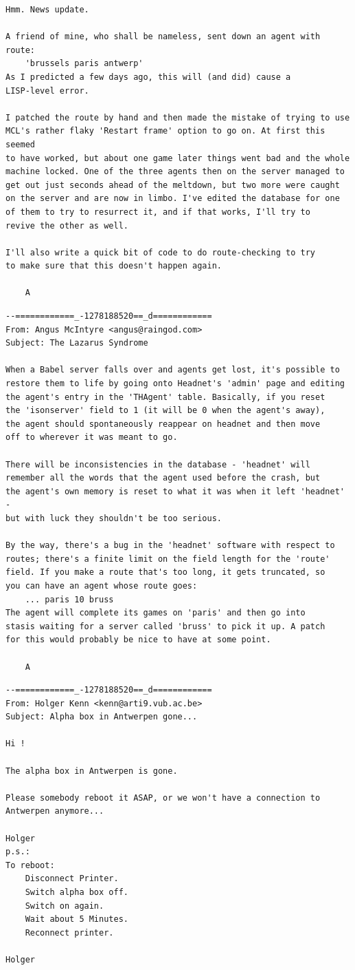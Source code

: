 {\begin{verbatim}
Hmm. News update.

A friend of mine, who shall be nameless, sent down an agent with route:
	'brussels paris antwerp'
As I predicted a few days ago, this will (and did) cause a 
LISP-level error.

I patched the route by hand and then made the mistake of trying to use 
MCL's rather flaky 'Restart frame' option to go on. At first this seemed 
to have worked, but about one game later things went bad and the whole 
machine locked. One of the three agents then on the server managed to 
get out just seconds ahead of the meltdown, but two more were caught 
on the server and are now in limbo. I've edited the database for one 
of them to try to resurrect it, and if that works, I'll try to 
revive the other as well.

I'll also write a quick bit of code to do route-checking to try 
to make sure that this doesn't happen again.

	A
\end{verbatim}
\begin{verbatim}
--============_-1278188520==_d============
From: Angus McIntyre <angus@raingod.com>
Subject: The Lazarus Syndrome

When a Babel server falls over and agents get lost, it's possible to 
restore them to life by going onto Headnet's 'admin' page and editing 
the agent's entry in the 'THAgent' table. Basically, if you reset 
the 'isonserver' field to 1 (it will be 0 when the agent's away), 
the agent should spontaneously reappear on headnet and then move 
off to wherever it was meant to go.

There will be inconsistencies in the database - 'headnet' will 
remember all the words that the agent used before the crash, but 
the agent's own memory is reset to what it was when it left 'headnet' - 
but with luck they shouldn't be too serious.

By the way, there's a bug in the 'headnet' software with respect to 
routes; there's a finite limit on the field length for the 'route' 
field. If you make a route that's too long, it gets truncated, so 
you can have an agent whose route goes:
	... paris 10 bruss
The agent will complete its games on 'paris' and then go into 
stasis waiting for a server called 'bruss' to pick it up. A patch 
for this would probably be nice to have at some point.

	A
\end{verbatim}
\begin{verbatim}
--============_-1278188520==_d============
From: Holger Kenn <kenn@arti9.vub.ac.be>
Subject: Alpha box in Antwerpen gone...

Hi !

The alpha box in Antwerpen is gone.

Please somebody reboot it ASAP, or we won't have a connection to
Antwerpen anymore...

Holger
p.s.: 
To reboot: 
	Disconnect Printer.
	Switch alpha box off.
	Switch on again.
	Wait about 5 Minutes.
	Reconnect printer.

Holger
\end{verbatim}}

